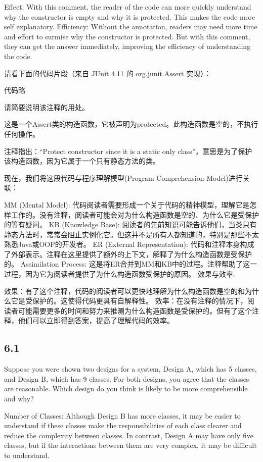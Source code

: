 \documentclass[]{ctexbook}
\begin{document}
Effect: With this comment, the reader of the code can more quickly understand why the constructor is empty and why it is protected. This makes the code more self explanatory.
Efficiency: Without the annotation, readers may need more time and effort to surmise why the constructor is protected. But with this comment, they can get the answer immediately, improving the efficiency of understanding the code.

请看下面的代码片段（来自 JUnit 4.11 的 org.junit.Assert 实现）：

代码略

请简要说明该注释的用处。

这是一个Assert类的构造函数，它被声明为protected。此构造函数是空的，不执行任何操作。

注释指出：“Protect constructor since it is a static only class”，意思是为了保护该构造函数，因为它属于一个只有静态方法的类。

现在，我们将这段代码与程序理解模型(Program Comprehension Model)进行关联：

MM (Mental Model): 代码阅读者需要形成一个关于代码的精神模型，理解它是怎样工作的。没有注释，阅读者可能会对为什么构造函数是空的、为什么它是受保护的等有疑问。
KB (Knowledge Base): 阅读者的先前知识可能告诉他们，当类只有静态方法时，常常会阻止实例化它。但这并不是所有人都知道的，特别是那些不太熟悉Java或OOP的开发者。
ER (External Representation): 代码和注释本身构成了外部表示。注释在这里提供了额外的上下文，解释了为什么构造函数是受保护的。
Assimilation Process: 这是将ER合并到MM和KB中的过程。注释帮助了这一过程，因为它为阅读者提供了为什么构造函数受保护的原因。
效果与效率:

效果：有了这个注释，代码的阅读者可以更快地理解为什么构造函数是空的和为什么它是受保护的。这使得代码更具有自解释性。
效率：在没有注释的情况下，阅读者可能需要更多的时间和努力来推测为什么构造函数是受保护的。但有了这个注释，他们可以立即得到答案，提高了理解代码的效率。

\subsection{6.1}
Suppose you were shown two designs for a system, Design A, which has 5 classes, and Design B, which has 9 classes. For both designs, you agree that the classes are reasonable. Which design do you think is likely to be more comprehensible and why?

Number of Classes: Although Design B has more classes, it may be easier to understand if these classes make the responsibilities of each class clearer and reduce the complexity between classes. In contrast, Design A may have only five classes, but if the interactions between them are very complex, it may be difficult to understand.
\end{document}
